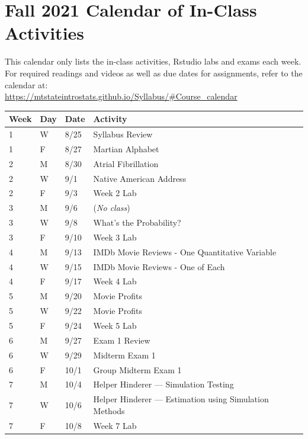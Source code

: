 \documentclass[
]{report}
\begin{document}
\nocite{*}

\hypertarget{fall-2021-calendar-of-in-class-activities}{%
\chapter*{Fall 2021 Calendar of In-Class Activities}\label{fall-2021-calendar-of-in-class-activities}}

This calendar only lists the in-class activities, Rstudio labs and exams each week. For required readings and videos as well as due dates for assignments, refer to the calendar at:\\
\href{new\%20calendar}{https://mtstateintrostats.github.io/Syllabus/\#Course\_calendar}

\begin{longtable}{|l|l|l|l|p{}|}
\hline
\textbf{Week}& \textbf{Day}& \textbf{Date}& \textbf{Activity} \\ \hline
\endhead
1& W& 8/25& Syllabus Review \\*
1& F& 8/27& Martian Alphabet \\ \hline
2& M& 8/30& Atrial Fibrillation \\*
2& W& 9/1& Native American Address \\* 
2& F& 9/3& Week 2 Lab \\ \hline
3& M& 9/6& (\textit{No class}) \\*
3& W& 9/8& What's the Probability? \\*
3& F& 9/10& Week 3 Lab \\ \hline
4& M& 9/13& IMDb Movie Reviews - One Quantitative Variable \\*
4& W& 9/15& IMDb Movie Reviews - One of Each \\*
4& F& 9/17& Week 4 Lab \\ \hline
5& M& 9/20& Movie Profits \\*
5& W& 9/22& Movie Profits \\*   
5& F& 9/24& Week 5 Lab \\ \hline
6& M& 9/27& Exam 1 Review \\*
6& W& 9/29& Midterm Exam 1 \\*  
6& F& 10/1& Group Midterm Exam 1 \\ \hline
7& M& 10/4& Helper Hinderer --- Simulation Testing \\*
7& W& 10/6& Helper Hinderer --- Estimation using Simulation Methods \\*
7& F& 10/8& Week 7 Lab \\ \hline

\end{longtable}
\end{document}
